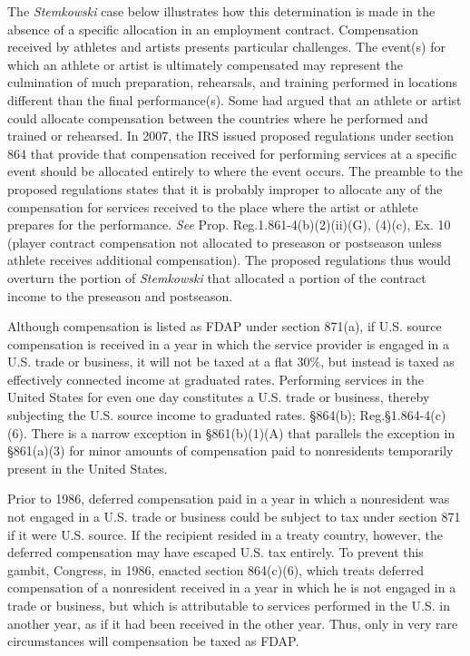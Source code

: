 The \emph{Stemkowski} case below illustrates how this determination is made in the absence of a specific allocation in an employment contract.  Compensation received by athletes and artists presents particular challenges.  The event(s) for which an athlete or artist is ultimately compensated may represent the culmination of much preparation, rehearsals, and training performed in locations different than the final performance(s).  Some had argued that an athlete or artist could allocate compensation between the countries where he performed and trained or rehearsed.  In 2007, the IRS issued proposed regulations under section 864 that provide that compensation received for performing services at a specific event should be allocated entirely to where the event occurs.  The preamble to the proposed regulations states that it is probably improper to allocate any of the compensation for services received to the place where the artist or athlete prepares for the performance.  \emph{See} Prop. Reg.\@ 1.861-4(b)(2)(ii)(G), (4)(c), Ex. 10 (player contract compensation not allocated to preseason or postseason unless athlete receives additional compensation).  The proposed regulations thus would overturn the portion of \emph{Stemkowski} that allocated a portion of the contract income to the preseason and postseason.  

Although compensation is listed as FDAP under section 871(a), if U.S. source compensation is received in a year in which the service provider is engaged in a U.S. trade or business, it will not be taxed at a flat 30\%, but instead is taxed as effectively connected income at graduated rates.  Performing services in the United States for even one day constitutes a U.S. trade or business, thereby subjecting the U.S. source income to graduated rates.  \S 864(b); Reg.\@ \S 1.864-4(c)(6). There is a narrow exception in \S 861(b)(1)(A) that parallels the exception in \S861(a)(3) for minor amounts of compensation paid to nonresidents temporarily present in the United States.  

Prior to 1986, deferred compensation paid in a year in which a nonresident was not engaged in a U.S. trade or business could be subject to tax under section 871 if it were U.S. source.  If the recipient resided in a treaty country, however, the deferred compensation may have escaped U.S. tax entirely.  To prevent this gambit, Congress, in 1986, enacted section 864(c)(6), which treats deferred compensation of a nonresident received in a year in which he is not engaged in a trade or business, but which is attributable to services performed in the U.S. in another year, as if it had been received in the other year.  Thus, only in very rare circumstances will compensation be taxed as FDAP.    


